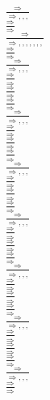 \documentclass[11pt]{article}
\begin{document}
\begin{center}
\bigskip
\\$\frac{\Rightarrow }{\Rightarrow , , , }$
\bigskip
\\$\frac{\Rightarrow }{\Rightarrow }$
\bigskip
\\$\frac{\Rightarrow }{\Rightarrow , , , , , , , }$
\bigskip
\\$\frac{\Rightarrow }{\Rightarrow }$
\bigskip
\\$\frac{\Rightarrow }{\Rightarrow , , , }$
\bigskip
\\$\frac{\Rightarrow }{\Rightarrow }$
\bigskip
\\$\frac{\Rightarrow }{\Rightarrow }$
\bigskip
\\$\frac{\Rightarrow }{\Rightarrow }$
\bigskip
\\$\frac{\Rightarrow }{\Rightarrow , , , }$
\bigskip
\\$\frac{\Rightarrow }{\Rightarrow }$
\bigskip
\\$\frac{\Rightarrow }{\Rightarrow }$
\bigskip
\\$\frac{\Rightarrow }{\Rightarrow }$
\bigskip
\\$\frac{\Rightarrow }{\Rightarrow , , , }$
\bigskip
\\$\frac{\Rightarrow }{\Rightarrow }$
\bigskip
\\$\frac{\Rightarrow }{\Rightarrow }$
\bigskip
\\$\frac{\Rightarrow }{\Rightarrow }$
\bigskip
\\$\frac{\Rightarrow }{\Rightarrow , , , }$
\bigskip
\\$\frac{\Rightarrow }{\Rightarrow }$
\bigskip
\\$\frac{\Rightarrow }{\Rightarrow }$
\bigskip
\\$\frac{\Rightarrow }{\Rightarrow }$
\bigskip
\\$\frac{\Rightarrow }{\Rightarrow , , , }$
\bigskip
\\$\frac{\Rightarrow }{\Rightarrow }$
\bigskip
\\$\frac{\Rightarrow }{\Rightarrow }$
\bigskip
\\$\frac{\Rightarrow }{\Rightarrow }$
\bigskip
\\$\frac{\Rightarrow }{\Rightarrow , , , }$
\bigskip
\\$\frac{\Rightarrow }{\Rightarrow }$
\bigskip
\\$\frac{\Rightarrow }{\Rightarrow }$
\bigskip
\\$\frac{\Rightarrow }{\Rightarrow }$
\bigskip
\\$\frac{\Rightarrow }{\Rightarrow , , , }$
\bigskip
\\$\frac{\Rightarrow }{\Rightarrow }$

\end{center}
\end{document}
